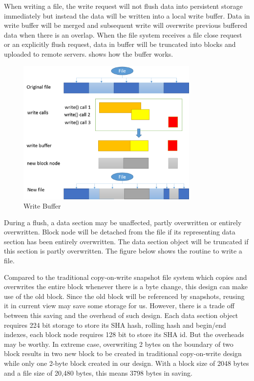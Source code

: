 	When writing a file, the write request will not flush data into persistent storage immediately but instead the data will be written into a local write buffer. Data in write buffer will be merged and subsequent write will overwrite previous buffered data when there is an overlap. When the file system receives a file close request or an explicitly flush request, data in buffer will be truncated into blocks and uploaded to remote servers.  shows how the buffer works.

\begin{figure}[hbtp]
\centering
\includegraphics[width=0.8\textwidth]{Chapter-3/figs/fig11.png}
\caption{Write Buffer}
\label{fig:buffer}
\end{figure}

	During a flush, a data section may be unaffected, partly overwritten or entirely overwritten. Block node will be detached from the file if its representing data section has been entirely overwritten. The data section object will be truncated if this section is partly overwritten. The figure below shows the routine to write a file.


    Compared to the traditional copy-on-write snapshot file system which copies and overwrites the entire block whenever there is a byte change, this design can make use of the old block. Since the old block will be referenced by snapshots, reusing it in current view may save some storage for us.
However, there is a trade off between this saving and the overhead of such design. Each data section object requires 224 bit storage to store its SHA hash, rolling hash and begin/end indexes, each block node requires 128 bit to store its SHA id. But the overheads may be worthy. In extreme case, overwriting 2 bytes on the boundary of two block results in two new block to be created in traditional copy-on-write design while only one 2-byte block created in our design. With a block size of 2048 bytes and a file size of 20,480 bytes, this means 3798 bytes in saving.

